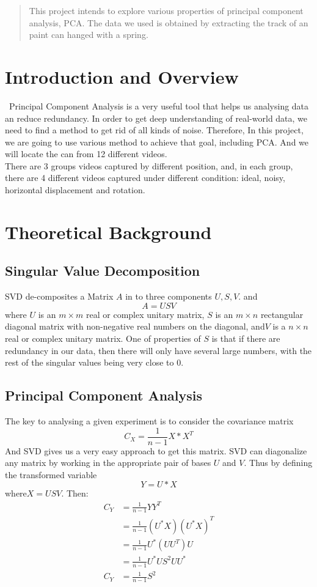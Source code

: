 \documentclass[12pt]{article}
\begin{document}
\maketitle

\begin{abstract}
This project intends to explore various properties of principal component analysis, PCA. The data we used is obtained by extracting the track of an paint can hanged with a spring.
\end{abstract}

\section{Introduction and Overview}\
	Principal Component Analysis is a very useful tool that helps us analysing data an reduce redundancy. In order to get deep understanding of real-world data, we need to find a method to get rid of all kinds of noise. Therefore, In this project, we are going to use various method to achieve that goal, including PCA. And we will locate the can from 12 different videos.\\
	
	There are 3 groups videos captured by different position, and, in each group, there are 4 different videos captured under different condition: ideal, noisy, horizontal displacement and rotation. 
	
\section{Theoretical Background}
\subsection{Singular Value Decomposition}
SVD de-composites a Matrix $A$ in to three components $U, S, V$. and
\[A = USV\]
where $U$  is an $ m\times m$ real or complex unitary matrix, $S$ is an $ m\times n$ rectangular diagonal matrix with non-negative real numbers on the diagonal, and$V$ is a $ n\times n$ real or complex unitary matrix.
One of properties of $S$ is that if there are redundancy in our data, then there will only have several large numbers, with the rest of the singular values being very close to 0.
\subsection{Principal Component Analysis}
The key to analysing a given experiment is to consider the covariance matrix
\[C_X = \frac{1}{n - 1}X*X^T\]
And SVD gives us a very easy approach to get this matrix. SVD can diagonalize any matrix by working in the appropriate pair of bases $U$ and $V$. Thus by defining the transformed variable
\[Y=U*X\]
where$X = USV$. Then:
\begin{align*}
C_Y &= \frac{1}{n-1}YY^T\\
&= \frac{1}{n-1}(U^*X)(U^*X)^T\\
&= \frac{1}{n-1}U^*(UU^T)U \\
&= \frac{1}{n-1} U^*US^2UU^*\\
C_Y &= \frac{1}{n - 1}S^2
\end{align*}
\end{document}
